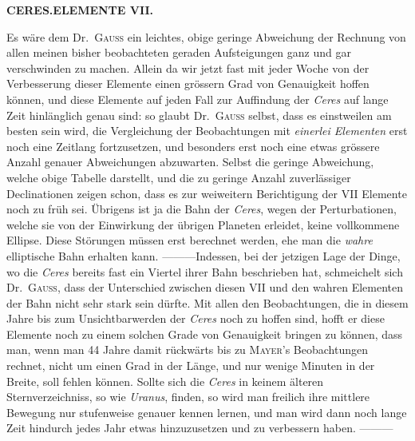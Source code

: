 \clearpage
\thispagestyle{empty}
\noindent{}%
%
\parbox[t]{\dimexpr\linewidth-24mm\relax}{\centering\footnotesize\bfseries CERES.\enspace ELEMENTE VII.\par}%
\makebox[12mm][r]{}\par\nobreak\medskip
\indent Es wäre dem Dr.\ \textsc{Gauss} ein leichtes, obige geringe Abweichung der Rechnung von allen meinen bisher beobachteten geraden Aufsteigungen ganz und gar verschwinden zu machen. Allein da wir jetzt fast mit jeder Woche von der Verbesserung dieser Elemente einen grössern Grad von Genauigkeit hoffen können, und diese Elemente auf jeden Fall zur Auffindung der \textit{Ceres} auf lange Zeit hinlänglich genau sind: so glaubt Dr.\ \textsc{Gauss} selbst, dass es einstweilen am besten sein wird, die Vergleichung der Beobachtungen mit \textit{einerlei Elementen} erst noch eine Zeitlang fortzusetzen, und besonders erst noch eine etwas grössere Anzahl genauer Abweichungen abzuwarten. Selbst die geringe Abweichung, welche obige Tabelle darstellt, und die zu geringe Anzahl zuverlässiger Declinationen zeigen schon, dass es zur weiweitern Berichtigung der VII Elemente noch zu früh sei. Übrigens ist ja die Bahn der \textit{Ceres}, wegen der Perturbationen, welche sie von der Einwirkung der übrigen Planeten erleidet, keine vollkommene Ellipse. Diese Störungen müssen erst berechnet werden, ehe man die \textit{wahre} elliptische Bahn erhalten kann. —\quad —\quad —\quad Indessen, bei der jetzigen Lage der Dinge, wo die \textit{Ceres} bereits fast ein Viertel ihrer Bahn beschrieben hat, schmeichelt sich Dr.\ \textsc{Gauss}, dass der Unterschied zwischen diesen VII und den wahren Elementen der Bahn nicht sehr stark sein dürfte. Mit allen den Beobachtungen, die in diesem Jahre bis zum Unsichtbarwerden der \textit{Ceres} noch zu hoffen sind, hofft er diese Elemente noch zu einem solchen Grade von Genauigkeit bringen zu können, dass man, wenn man 44 Jahre damit rückwärts bis zu \textsc{Mayer}'s Beobachtungen rechnet, nicht um einen Grad in der Länge, und nur wenige Minuten in der Breite, soll fehlen können. Sollte sich die \textit{Ceres} in keinem älteren Sternverzeichniss, so wie \textit{Uranus}, finden, so wird man freilich ihre mittlere Bewegung nur stufenweise genauer kennen lernen, und man wird dann noch lange Zeit hindurch jedes Jahr etwas hinzuzusetzen und zu verbessern haben. —\quad —\quad —


